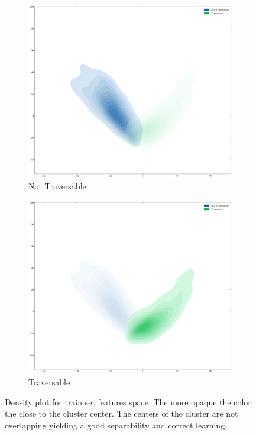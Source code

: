 \documentclass[../document.tex]{subfiles}
\begin{document}
\begin{figure} [htbp]
    \begin{subfigure}[b]{0.48\textwidth}
        \includegraphics[width=\linewidth]{../img/5/pca/pca-0-density.png}
        \caption{Not Traversable}
    \end{subfigure}
    \begin{subfigure}[b]{0.48\textwidth}
        \includegraphics[width=\linewidth]{../img/5/pca/pca-1-density.png}
        \caption{Traversable}
    \end{subfigure}
    \caption{Density plot for train set features space. The more opaque the color the close to the cluster center. The centers of the cluster are not overlapping yielding a good separability and correct learning.}
    \end{figure}
\end{document}
